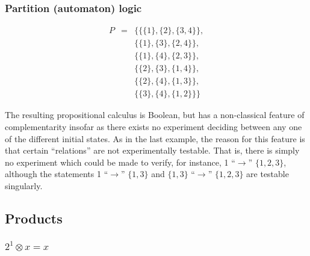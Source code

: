 \subsubsection*{Partition (automaton) logic}
\begin{eqnarray*}
P&=&\{
\{\{1\},\{2\},\{3,4\}\},       \\
&&\{\{1\},\{3\},\{2,4\}\},       \\
&&\{\{1\},\{4\},\{2,3\}\},       \\
&&\{\{2\},\{3\},\{1,4\}\},       \\
&&\{\{2\},\{4\},\{1,3\}\},       \\
&&\{\{3\},\{4\},\{1,2\}\}
\}
\end{eqnarray*}

The resulting propositional calculus is Boolean, but has
a non-classical feature of complementarity insofar as there exists no
experiment deciding between any one of the different initial states.
As in the last example, the reason for this feature is that
certain ``relations'' are not experimentally testable. That is, there is
simply no experiment which could be made to verify, for instance,
1 ``$\rightarrow$'' $\{1,2,3\}$,
although the statements
1 ``$\rightarrow$'' $\{1,3\}$ and
$\{1,3\}$ ``$\rightarrow$'' $\{1,2,3\}$ are testable singularly.

\subsection{Products}

\clearpage
\subsubsection{$2^1\otimes x=x$}
